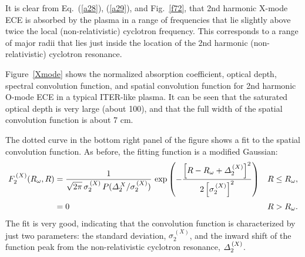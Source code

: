 \documentclass{iopjournal}
\begin{document}
 It is clear from Eq.~(\ref{a28}),
(\ref{a29}), and Fig.~\ref{f72}, that 2nd harmonic X-mode  ECE is absorbed by the plasma in a range of frequencies that lie slightly above twice the local (non-relativistic) cyclotron frequency. This corresponds to a range of major radii that lies just inside the location of the 2nd harmonic (non-relativistic) cyclotron resonance. 

Figure~\ref{Xmode} shows the normalized absorption coefficient, optical depth, spectral convolution function, and spatial convolution function for
2nd harmonic O-mode ECE in a typical ITER-like plasma. It can be seen that the saturated optical depth is very  large (about 100), and that the full 
width of the spatial convolution function is about 7 cm.

  The dotted curve in the bottom right panel of the figure shows a fit to the
spatial convolution function. As before, the fitting function is a modified Gaussian:
\begin{align}
F_2^{\,(X)}(R_\omega,R)&= \frac{1}{\sqrt{2\pi}\,\sigma_2^{\,(X)} \,P({\mit\Delta}_2^{\,X}/\sigma_2^{\,(X)})}\,
\exp\left(-\frac{\left[R-R_\omega+{\mit\Delta}_2^{\,(X)}\right]^2}{2\left[\sigma_2^{\,(X)}\right]^2}\right)&R\leq R_\omega,\\[0.5ex]
&= 0& R>R_\omega.
\end{align}
  The fit is very good, indicating that the convolution function 
is characterized by just two parameters: the standard deviation, $\sigma_2^{\,(X)}$, and the inward shift
of the function peak from the non-relativistic cyclotron resonance, ${\mit\Delta}_2^{\,(X)}$. 
\end{document}
